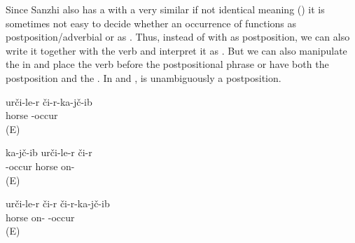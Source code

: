 Since Sanzhi also has a   with a very similar if not identical meaning () it is sometimes not easy to decide whether an occurrence of  functions as postposition\slash adverbial or as . Thus, instead of  with  as postposition, we can also write it together with the verb and interpret it as  .  But we can also manipulate the  in  and place the verb before the postpositional phrase  or have both the postposition and the  . In  and ,  is unambiguously a postposition.

\begin{exe}
		\ex	\label{ex:He fell from the horse verbs_4}
	\gll	urči-le-r či-r-ka-jč-ib\\
		horse -occur\\
	\glt	{} (E)
	
	\ex	\label{ex:He fell from the horse verbs_2}
	\gll	ka-jč-ib urči-le-r	či-r \\
		-occur horse on-	\\
	\glt	{} (E)
	
		\ex	\label{ex:He fell from the horse verbs_3}
	\gll	urči-le-r či-r	či-r-ka-jč-ib\\
		horse on- -occur\\
	\glt	{} (E)
	
\end{exe}


\subsection{ }
\label{ssec:postposition urka}

